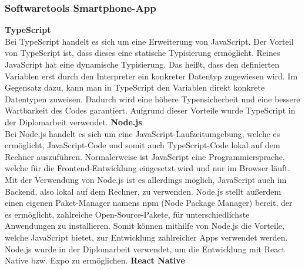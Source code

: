 \documentclass[11pt, twoside]{article}
\begin{document}
\subsubsection{Softwaretools Smartphone-App}
\textbf{TypeScript} \\
Bei TypeScript handelt es sich um eine Erweiterung von JavaScript. Der Vorteil von TypeScript ist, dass dieses eine statische Typisierung ermöglicht. Reines JavaScript hat eine dynamische Typisierung. Das heißt, dass den definierten Variablen erst durch den Interpreter ein konkreter Datentyp zugewiesen wird. Im Gegensatz dazu, kann man in TypeScript den Variablen direkt konkrete Datentypen zuweisen. Dadurch wird eine höhere Typensicherheit und eine bessere Wartbarkeit des Codes garantiert. \parencite[vgl.][]{noauthor_urlpi32_2023} Aufgrund dieser Vorteile wurde TypeScript in der Diplomarbeit verwendet. 
\vspace{4mm}\newline
\textbf{Node.js} \\
Bei Node.js handelt es sich um eine JavaScript-Laufzeitumgebung, welche es ermöglicht, JavaScript-Code und somit auch TypeScript-Code lokal auf dem Rechner auszuführen. Normalerweise ist JavaScript eine Programmiersprache, welche für die Frontend-Entwicklung eingesetzt wird und nur im Browser läuft. Mit der Verwendung von Node.js ist es allerdings möglich, JavaScript auch im Backend, also lokal auf dem Rechner, zu verwenden. Node.js stellt außerdem einen eigenen Paket-Manager namens \glqq npm\grqq{} (Node Package Manager) bereit, der es ermöglicht, zahlreiche Open-Source-Pakete, für unterschiedlichste Anwendungen zu installieren. Somit können mithilfe von Node.js die Vorteile, welche JavaScript bietet, zur Entwicklung zahlreicher Apps verwendet werden. \parencite[vgl.][]{noauthor_urlpi25_2021}
Node.js wurde in der Diplomarbeit verwendet, um die Entwicklung mit React Native bzw. Expo zu ermöglichen.
\vspace{4mm}\newline
\textbf{React Native} \\
\end{document}
